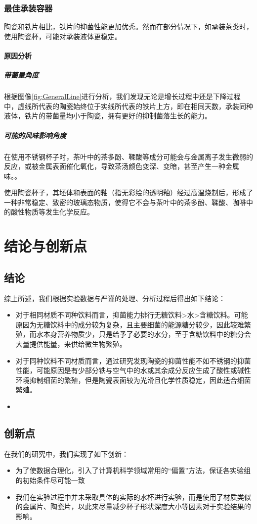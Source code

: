 \documentclass[12pt,a4paper]{ctexart}
\begin{document}
\subsubsection{最佳承装容器}
陶瓷和铁片相比，铁片的抑菌性能更加优秀。然而在部分情况下，如承装茶类时，使用陶瓷杯，可能对承装液体更稳定。

\paragraph{原因分析}
\subparagraph{带菌量角度}
根据图像\ref{fig:GeneralLine}进行分析，我们发现无论是增长过程中还是下降过程中，虚线所代表的陶瓷始终位于实线所代表的铁片上方，即在相同天数，承装同种液体，铁片的带菌量均小于陶瓷，拥有更好的抑制菌落生长的能力。
\subparagraph{可能的风味影响角度}
在使用不锈钢杯子时，茶叶中的茶多酚、鞣酸等成分可能会与金属离子发生微弱的反应，或被金属表面催化氧化，导致茶汤颜色变深、变暗，甚至产生一种金属味。\cite{JSHJ201504002}。

使用陶瓷杯子，其坯体和表面的釉（指无彩绘的透明釉）经过高温烧制后，形成了一种非常稳定、致密的玻璃态物质，使得它不会与茶叶中的茶多酚、鞣酸、咖啡中的酸性物质等发生化学反应。 

\section{结论与创新点}
\subsection{结论}
综上所述，我们根据实验数据与严谨的处理、分析过程后得出如下结论：
\begin{itemize}
    \item 对于相同材质不同种饮料而言，抑菌能力排行无糖饮料>水>含糖饮料。可能原因为无糖饮料中的成分较为复杂，且主要细菌的能源糖分较少，因此较难繁殖，而水本身营养物质少，只是给予了必要的水分，至于含糖饮料中的糖分会大量提供能量，来供给微生物繁殖。
    \item 对于同种饮料不同材质而言，通过研究发现陶瓷的抑菌性能不如不锈钢的抑菌性能，可能原因是有少部分铁与空气中的水或其余成分反应生成了酸性或碱性环境抑制细菌的繁殖，但是陶瓷表面较为光滑且化学性质稳定，因此适合细菌繁殖。
    \item 
\end{itemize}

\subsection{创新点}
在我们的研究中，我们实现了如下创新：
\begin{itemize}
    \item 为了使数据合理化，引入了计算机科学领域常用的“偏置”方法，保证各实验组的初始条件尽可能一致
    \item 我们在实验过程中并未采取具体的实际的水杯进行实验，而是使用了材质类似的金属片、陶瓷片，以此来尽量减少杯子形状深度大小等因素对于实验结果的影响。
\end{itemize}
\end{document}
